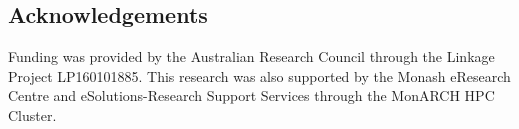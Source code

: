 \documentclass[letter,12pt]{article}
\begin{document}
\subsection*{Acknowledgements}

Funding was provided by the Australian Research Council through the Linkage Project LP160101885. This research was also supported by the Monash eResearch Centre and eSolutions-Research Support Services through the MonARCH HPC Cluster.


\end{document}
